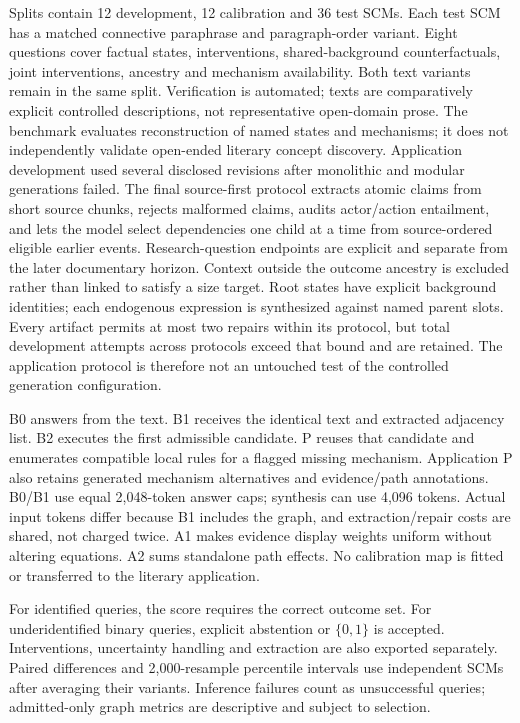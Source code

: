 \documentclass{svproc}
\begin{document}
Splits contain 12 development, 12 calibration and 36 test SCMs. Each test SCM has a matched connective paraphrase and paragraph-order variant. Eight questions cover factual states, interventions, shared-background counterfactuals, joint interventions, ancestry and mechanism availability. Both text variants remain in the same split. Verification is automated; texts are comparatively explicit controlled descriptions, not representative open-domain prose. The benchmark evaluates reconstruction of named states and mechanisms; it does not independently validate open-ended literary concept discovery. Application development used several disclosed revisions after monolithic and modular generations failed. The final source-first protocol extracts atomic claims from short source chunks, rejects malformed claims, audits actor/action entailment, and lets the model select dependencies one child at a time from source-ordered eligible earlier events. Research-question endpoints are explicit and separate from the later documentary horizon. Context outside the outcome ancestry is excluded rather than linked to satisfy a size target. Root states have explicit background identities; each endogenous expression is synthesized against named parent slots. Every artifact permits at most two repairs within its protocol, but total development attempts across protocols exceed that bound and are retained. The application protocol is therefore not an untouched test of the controlled generation configuration.

B0 answers from the text. B1 receives the identical text and extracted adjacency list. B2 executes the first admissible candidate. P reuses that candidate and enumerates compatible local rules for a flagged missing mechanism. Application P also retains generated mechanism alternatives and evidence/path annotations. B0/B1 use equal 2,048-token answer caps; synthesis can use 4,096 tokens. Actual input tokens differ because B1 includes the graph, and extraction/repair costs are shared, not charged twice. A1 makes evidence display weights uniform without altering equations. A2 sums standalone path effects. No calibration map is fitted or transferred to the literary application.

For identified queries, the score requires the correct outcome set. For underidentified binary queries, explicit abstention or $\{0,1\}$ is accepted. Interventions, uncertainty handling and extraction are also exported separately. Paired differences and 2,000-resample percentile intervals use independent SCMs after averaging their variants. Inference failures count as unsuccessful queries; admitted-only graph metrics are descriptive and subject to selection.
\end{document}
